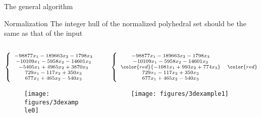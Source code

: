 \begin{frame}{The general algorithm}
	\begin{block}{Normalization}
		The integer hull of the normalized polyhedral set should be the same as that of the input
		\begin{columns}
		\begin{column}{0.5\textwidth}
			\begin{equation*}
				\scriptsize
				\label{eq:3dexample}
				\left\{   \begin{array}{crl}
					-98877 x_1 - 189663 x_2 - 1798 x_3 &\le& 705915\\	
					-10109 x_1 - 5958 x_2 - 14601 x_3 &\le& 31333\\
					-5405 x_1 + 4965 x_2 + 3870 x_3 &\le& 4303504\\
					729 x_1 - 117 x_2 + 350 x_3 &\le& 4561\\
					677 x_1 + 465 x_2 - 540 x_3 &\le& 3489
				\end{array}
				\right.
			\end{equation*}
			\begin{center}
				\begin{figure}[H]
					\texttt{[image: figures/3dexample0]}
				\end{figure}	
			\end{center}
		\end{column}
		\hfill
		\begin{column}{0.5\textwidth}
			\begin{equation*}
				\scriptsize
				\label{eq:3dexamplenew}
				\left\{   \begin{array}{crl}
					-98877 x_1 - 189663 x_2 - 1798 x_3 &\le& 705915\\	
					-10109 x_1 - 5958 x_2 - 14601 x_3 &\le& 31333\\
					\color{red}{-1081 x_1 + 993 x_2 + 774 x_3} &\color{red}\le& \color{red}860700\\
					729 x_1 - 117 x_2 + 350 x_3 &\le& 4561\\
					677 x_1 + 465 x_2 - 540 x_3 &\le& 3489
				\end{array}
				\right.
			\end{equation*}
			\begin{center}
				\begin{figure}[H]
					\texttt{[image: figures/3dexample1]}
				\end{figure}
				
			\end{center}
			
		\end{column}
	\end{columns}
		
	\end{block}
\end{frame}
